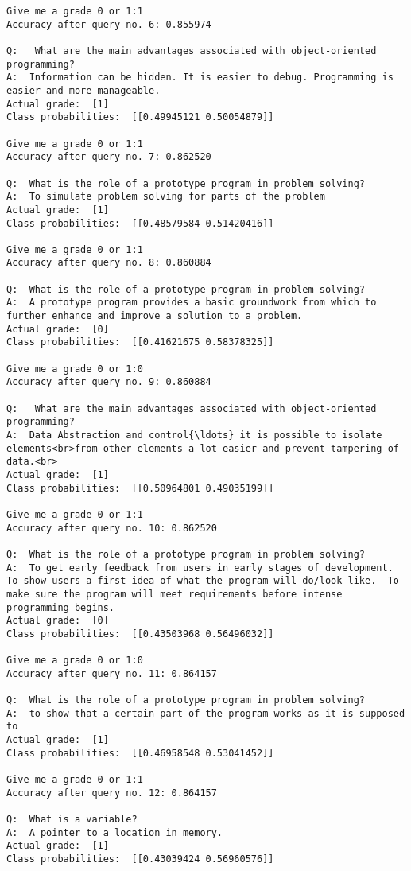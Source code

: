 \documentclass[11pt]{article}
\begin{document}
\begin{Verbatim}[commandchars=\\\{\}]
Give me a grade 0 or 1:1
Accuracy after query no. 6: 0.855974

Q:   What are the main advantages associated with object-oriented programming?
A:  Information can be hidden. It is easier to debug. Programming is easier and more manageable. 
Actual grade:  [1]
Class probabilities:  [[0.49945121 0.50054879]]

Give me a grade 0 or 1:1
Accuracy after query no. 7: 0.862520

Q:  What is the role of a prototype program in problem solving?
A:  To simulate problem solving for parts of the problem
Actual grade:  [1]
Class probabilities:  [[0.48579584 0.51420416]]

Give me a grade 0 or 1:1
Accuracy after query no. 8: 0.860884

Q:  What is the role of a prototype program in problem solving?
A:  A prototype program provides a basic groundwork from which to further enhance and improve a solution to a problem.
Actual grade:  [0]
Class probabilities:  [[0.41621675 0.58378325]]

Give me a grade 0 or 1:0
Accuracy after query no. 9: 0.860884

Q:   What are the main advantages associated with object-oriented programming?
A:  Data Abstraction and control{\ldots} it is possible to isolate elements<br>from other elements a lot easier and prevent tampering of data.<br>
Actual grade:  [1]
Class probabilities:  [[0.50964801 0.49035199]]

Give me a grade 0 or 1:1
Accuracy after query no. 10: 0.862520

Q:  What is the role of a prototype program in problem solving?
A:  To get early feedback from users in early stages of development.  To show users a first idea of what the program will do/look like.  To make sure the program will meet requirements before intense programming begins.
Actual grade:  [0]
Class probabilities:  [[0.43503968 0.56496032]]

Give me a grade 0 or 1:0
Accuracy after query no. 11: 0.864157

Q:  What is the role of a prototype program in problem solving?
A:  to show that a certain part of the program works as it is supposed to
Actual grade:  [1]
Class probabilities:  [[0.46958548 0.53041452]]

Give me a grade 0 or 1:1
Accuracy after query no. 12: 0.864157

Q:  What is a variable?
A:  A pointer to a location in memory.
Actual grade:  [1]
Class probabilities:  [[0.43039424 0.56960576]]


\end{Verbatim}
\end{document}
